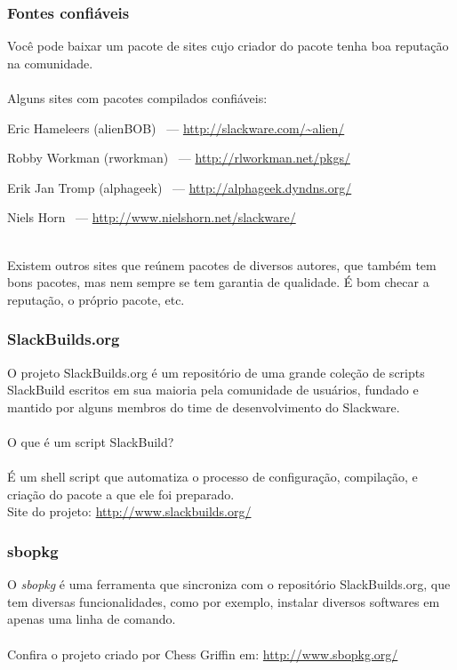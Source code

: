 \documentclass{beamer}
\begin{document}
\begin{frame}
	\frametitle{Fontes confiáveis}
	Você pode baixar um pacote de sites cujo criador do pacote tenha boa
	reputação na comunidade.\\
	~\\
	Alguns sites com pacotes compilados confiáveis:
	~\\
	\begin{itemize}
		\tiny{
		\item Eric Hameleers (alienBOB) ~--- \url{http://slackware.com/~alien/}
		\item Robby Workman (rworkman) ~--- \url{http://rlworkman.net/pkgs/}
		\item Erik Jan Tromp (alphageek) ~--- \url{http://alphageek.dyndns.org/}
		\item Niels Horn ~--- \url{http://www.nielshorn.net/slackware/}}
	\end{itemize}
	~\\
	Existem outros sites que reúnem pacotes de diversos autores, que também tem bons
	pacotes, mas nem sempre se tem garantia de qualidade. É bom checar a reputação,
	o próprio pacote, etc.
\end{frame}

\begin{frame}
	\frametitle{SlackBuilds.org}
	O projeto SlackBuilds.org é um repositório de uma grande coleção de scripts
	SlackBuild escritos em sua maioria pela comunidade de usuários, fundado
	e mantido por alguns membros do time de desenvolvimento do Slackware.\\
	~\\
	O que é um script SlackBuild?\\
	~\\
	É um shell script que automatiza o processo de configuração, compilação,
	e criação do pacote a que ele foi preparado.
	~\\
	Site do projeto: \url{http://www.slackbuilds.org/}
\end{frame}

\begin{frame}
	\frametitle{sbopkg}
	O \textit{sbopkg} é uma ferramenta que sincroniza com o repositório
	SlackBuilds.org, que tem diversas funcionalidades, como por exemplo,
	instalar diversos softwares em apenas uma linha de comando.\\
	~\\
	Confira o projeto criado por Chess Griffin em: \url{http://www.sbopkg.org/}
\end{frame}
\end{document}
